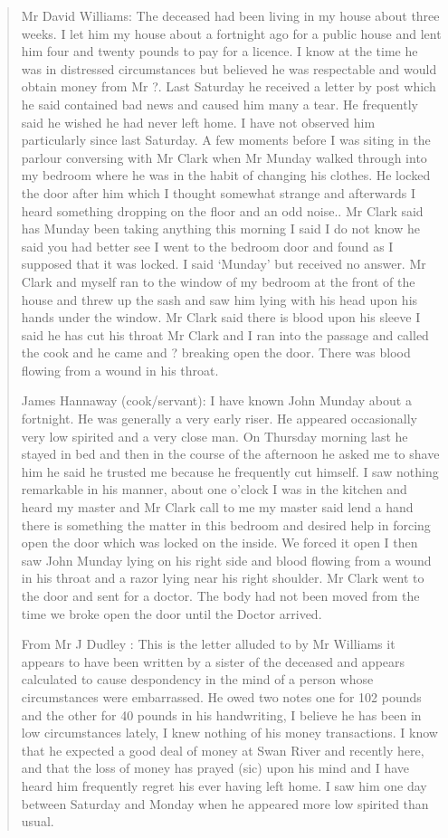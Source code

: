 \begin{quotation}
Mr David Williams: The deceased had been living in my house about three weeks. I let him my house about a fortnight ago for a public house and lent him four and twenty pounds to pay for a licence. I know at the time he was in distressed circumstances but believed he was respectable and would obtain money from Mr ?. Last Saturday he received a letter by post which he said contained bad news and caused him many a tear. He frequently said he wished he had never left home. I have not observed him particularly since last Saturday. A few moments before I was siting in the parlour conversing with Mr Clark when Mr Munday walked through into my bedroom where he was in the habit of changing his clothes. He locked the door after him which I thought somewhat strange and afterwards I heard something dropping on the floor and an odd noise.. Mr Clark said has Munday been taking anything this morning I said I do not know he said you had better see I went to the bedroom door and found as I supposed that it was locked. I said `Munday' but received no answer. Mr Clark and myself ran to the window of my bedroom at the front of the house and threw up the sash and saw him lying with his head upon his hands under the window. Mr Clark said there is blood upon his sleeve I said he has cut his throat Mr Clark and I ran into the passage and called the cook and he came and ? breaking open the door. There was blood flowing from a wound in his throat.

James Hannaway (cook/servant): I have known John Munday about a fortnight. He was generally a very early riser. He appeared occasionally very low spirited and a very close man. On Thursday morning last he stayed in bed and then in the course of the afternoon he asked me to shave him he said he trusted me because he frequently cut himself. I saw nothing remarkable in his manner, about one o'clock I was in the kitchen and heard my master and Mr Clark call to me my master said lend a hand there is something the matter in this bedroom and desired help in forcing open the door which was locked on the inside. We forced it open I then saw John Munday lying on his right side and blood flowing from a wound in his throat and a razor lying near his right shoulder. Mr Clark went to the door and sent for a doctor. The body had not been moved from the time we broke open the door until the Doctor arrived.

From Mr J Dudley : This is the letter alluded to by Mr Williams it appears to have been written by a sister of the deceased and appears calculated to cause despondency in the mind of a person whose circumstances were embarrassed. He owed two notes one for 102 pounds and the other for 40 pounds in his handwriting, I believe he has been in low circumstances lately, I knew nothing of his money transactions. I know that he expected a good deal of money at Swan River and recently here, and that the loss of money has prayed (sic) upon his mind and I have heard him frequently regret his ever having left home. I saw him one day between Saturday and Monday when he appeared more low spirited than usual.


\end{quotation}
